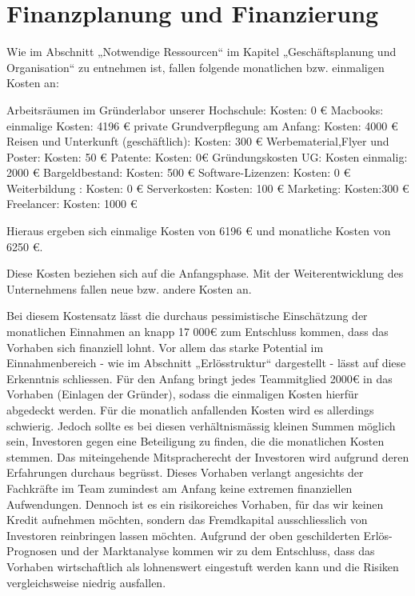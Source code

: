 \chapter{Finanzplanung und Finanzierung}

Wie im Abschnitt „Notwendige Ressourcen“ im Kapitel „Geschäftsplanung und Organisation“ zu entnehmen ist, fallen folgende monatlichen bzw. einmaligen Kosten an:


Arbeitsräumen im Gründerlabor unserer Hochschule: Kosten: 0 €
Macbooks: einmalige Kosten:  4196 €
private Grundverpflegung am Anfang:  Kosten: 4000 €
Reisen und Unterkunft  (geschäftlich):  Kosten: 300 €
Werbematerial,Flyer und Poster: Kosten: 50 €
Patente: Kosten: 0€
Gründungskosten UG: Kosten einmalig: 2000 €
Bargeldbestand: Kosten: 500 €
Software-Lizenzen: Kosten: 0 €
Weiterbildung : Kosten: 0 €
Serverkosten: Kosten: 100 €
Marketing: Kosten:300 €
Freelancer: Kosten: 1000 €

Hieraus ergeben sich einmalige Kosten von 6196 € und monatliche Kosten von 6250 €.

Diese Kosten beziehen sich auf die Anfangsphase. Mit der Weiterentwicklung des Unternehmens fallen neue bzw. andere Kosten an.

Bei diesem Kostensatz lässt die durchaus pessimistische Einschätzung der monatlichen Einnahmen an knapp 17 000€ zum Entschluss kommen, dass das Vorhaben sich finanziell lohnt. Vor allem das starke Potential im Einnahmenbereich - wie im Abschnitt „Erlösstruktur“ dargestellt - lässt auf diese Erkenntnis schliessen.
Für den Anfang bringt jedes Teammitglied 2000€ in das Vorhaben (Einlagen der Gründer), sodass die einmaligen Kosten hierfür abgedeckt werden. Für die monatlich anfallenden Kosten wird es allerdings schwierig. Jedoch sollte es bei diesen verhältnismässig kleinen Summen möglich sein, Investoren gegen eine Beteiligung zu finden, die die monatlichen Kosten stemmen. Das miteingehende Mitspracherecht der Investoren wird aufgrund deren Erfahrungen durchaus begrüsst. Dieses Vorhaben verlangt angesichts der Fachkräfte im Team zumindest am Anfang keine extremen finanziellen Aufwendungen. Dennoch ist es ein risikoreiches Vorhaben, für das wir keinen Kredit aufnehmen möchten, sondern das Fremdkapital ausschliesslich von Investoren reinbringen lassen möchten. Aufgrund der oben geschilderten Erlös-Prognosen und der Marktanalyse kommen wir zu dem Entschluss, dass das Vorhaben wirtschaftlich als lohnenswert eingestuft werden kann und die Risiken vergleichsweise niedrig ausfallen.

